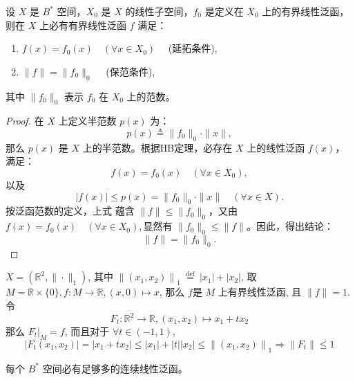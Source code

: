 \documentclass[lang=cn,newtx,10pt,scheme=chinese,thmcnt=chapter]{elegantbook}
\begin{document}
\begin{theorem}
    设 \( X \) 是 \( B^* \) 空间，\( X_0 \) 是 \( X \) 的线性子空间，\( f_0 \) 是定义在 \( X_0 \) 上的有界线性泛函，则在 \( X \) 上必有有界线性泛函 \( f \) 满足：
    \begin{enumerate}
        \item \( f(x) = f_0(x) \quad (\forall x \in X_0) \quad \) (延拓条件),
        \item \( \|f\| = \|f_0\|_0 \quad \) (保范条件),
    \end{enumerate}
    其中 \( \|f_0\|_0 \) 表示 \( f_0 \) 在 \( X_0 \) 上的范数。
\end{theorem}

\begin{proof}
    在 \( X \) 上定义半范数 \( p(x) \) 为：
    \[
    p(x) \triangleq \|f_0\|_0 \cdot \|x\|,
    \]
    那么 \( p(x) \) 是 \( X \) 上的半范数。根据HB定理，必存在 \( X \) 上的线性泛函 \( f(x) \)，满足：
    \[
    f(x) = f_0(x) \quad (\forall x \in X_0),
    \]
    以及
    \[
    |f(x)| \leq p(x) = \|f_0\|_0 \cdot \|x\| \quad (\forall x \in X).
    \]
    按泛函范数的定义，上式 蕴含 \( \|f\| \leq \|f_0\|_0 \)，又由$   f(x) = f_0(x) \quad (\forall x \in X_0),$显然有 \( \|f_0\|_0 \leq \|f\| \)。因此，得出结论：
    \[
    \|f\| = \|f_0\|_0.
    \]
\end{proof}
\begin{example} 
$X=\left( \mathbb{R} ^2,\|\cdot\|_1\right)$, 其中 $\left\|\left(x_1, x_2\right)\right\|_1 \stackrel{\text { def }}{=}\left|x_1\right|+\left|x_2\right|$, 取 $M= \mathbb{R} \times\{0\}, f: M \rightarrow \mathbb{R} ,(x, 0) \mapsto x$, 那么 $f$是 $M$ 上有界线性泛函, 且 $\|f\|=1$.令
\begin{equation*}
F_t: \mathbb{R} ^2 \rightarrow \mathbb{R} ,\left(x_1, x_2\right) \mapsto x_1+t x_2
\end{equation*}
那么 $\left.F_t\right|_M=f$, 而且对于 $\forall t \in(-1,1)$,
\begin{equation*}
\left|F_t\left(x_1, x_2\right)\right|=\left|x_1+t x_2\right| \leqslant\left|x_1\right|+|t|\left|x_2\right| \leqslant\left\|\left(x_1, x_2\right)\right\|_1 \Rightarrow\left\|F_t\right\| \leqslant 1
\end{equation*}
\end{example}


\begin{corollary}
    每个 \( B^* \) 空间必有足够多的连续线性泛函。
\end{corollary}
\end{document}

